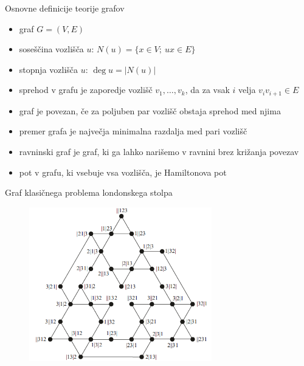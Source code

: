 \documentclass{beamer}
\DeclareMathOperator {\stopnja} {deg}
\begin{document}
\begin{frame}{Osnovne definicije teorije grafov}
    \begin{itemize}
        \item graf $ G = (V, E) $
        \item \alert{soseščina} vozlišča $u$: $N(u) = \{x \in V;\ ux \in E\}$
        \item \alert{stopnja} vozlišča $u$: $\stopnja u  = \lvert N(u) \rvert$
        \item \alert{sprehod} v grafu je zaporedje vozlišč $v_1,\ldots, v_k$, da za vsak $i$ velja $v_i v_{i+1} \in E$
        \item graf je \alert{povezan}, če za poljuben par vozlišč obstaja sprehod med njima
        \item \alert{premer} grafa je največja minimalna razdalja med pari vozlišč
    \end{itemize}
\end{frame}

\begin{frame}
    \begin{itemize}
        \item \alert{ravninski} graf je graf, ki ga lahko narišemo v ravnini brez križanja povezav
        \item pot v grafu, ki vsebuje vsa vozlišča, je \alert{Hamiltonova pot}
    \end{itemize}
\end{frame}

\begin{frame}{Graf klasičnega problema londonskega stolpa}
    
    \begin{figure}
        \centering
        \includegraphics[height=190pt]{../img/tolgraph.png}
    \end{figure}
\end{frame}
\end{document}
